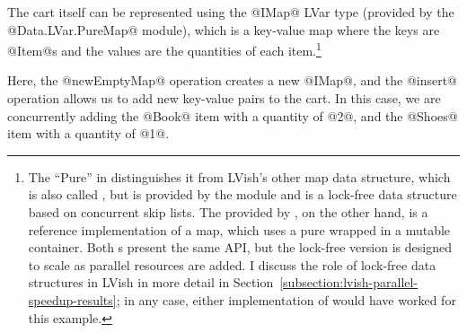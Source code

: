 The cart itself can be represented using the @IMap@ LVar type
(provided by the @Data.LVar.PureMap@ module), which is a key-value map
where the keys are @Item@s and the values are the quantities of each
item.\footnote{The ``Pure'' in  distinguishes it
  from LVish's other map data structure, which is also called
  , but is provided by the  module and is
  a lock-free data structure based on concurrent skip lists.  The
   provided by , on the other hand, is
  a reference implementation of a map, which uses a pure 
  wrapped in a mutable container.  Both s present the same
  API, but the lock-free version is designed to scale as parallel
  resources are added.  I discuss the role of lock-free data
  structures in LVish in more detail in
  Section~\ref{subsection:lvish-parallel-speedup-results}; in any
  case, either implementation of  would have worked for this
  example.}


\singlespacing

\doublespacing

Here, the @newEmptyMap@ operation creates a new @IMap@, and the
@insert@ operation allows us to add new key-value pairs to the cart.
In this case, we are concurrently adding the @Book@ item with a
quantity of @2@, and the @Shoes@ item with a quantity of @1@.

